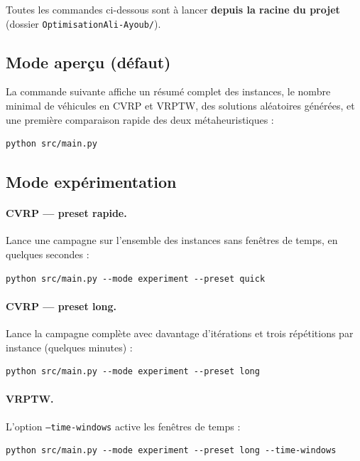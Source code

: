 \documentclass[11pt,a4paper]{article}
\begin{document}
Toutes les commandes ci-dessous sont à lancer \textbf{depuis la racine du projet} (dossier \texttt{OptimisationAli-Ayoub/}).

\subsection{Mode aperçu (défaut)}

La commande suivante affiche un résumé complet des instances, le nombre minimal de véhicules en CVRP et VRPTW, des solutions aléatoires générées, et une première comparaison rapide des deux métaheuristiques :

\begin{lstlisting}
python src/main.py
\end{lstlisting}

\subsection{Mode expérimentation}

\paragraph{CVRP — preset rapide.}
Lance une campagne sur l'ensemble des instances sans fenêtres de temps, en quelques secondes :

\begin{lstlisting}
python src/main.py --mode experiment --preset quick
\end{lstlisting}

\paragraph{CVRP — preset long.}
Lance la campagne complète avec davantage d'itérations et trois répétitions par instance (quelques minutes) :

\begin{lstlisting}
python src/main.py --mode experiment --preset long
\end{lstlisting}

\paragraph{VRPTW.}
L'option \texttt{--time-windows} active les fenêtres de temps :

\begin{lstlisting}
python src/main.py --mode experiment --preset long --time-windows
\end{lstlisting}
\end{document}
